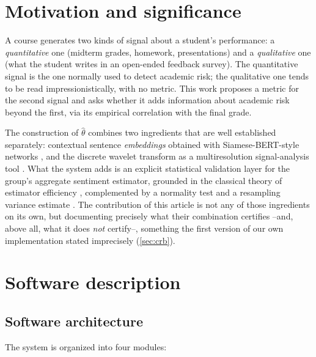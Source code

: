 \documentclass[11pt,a4paper,oneside]{article}
\theoremstyle{definition}
\begin{document}
\section{Motivation and significance}
\label{sec:motivacion}

A course generates two kinds of signal about a student's performance: a \emph{quantitative} one
(midterm grades, homework, presentations) and a \emph{qualitative} one (what the student writes
in an open-ended feedback survey). The quantitative signal is the one normally used to detect
academic risk; the qualitative one tends to be read impressionistically, with no metric. This
work proposes a metric for the second signal and asks whether it adds information about academic
risk beyond the first, via its empirical correlation with the final grade.

The construction of $\hat\theta$ combines two ingredients that are well established separately:
contextual sentence \emph{embeddings} obtained with Siamese-BERT-style networks
\cite{ReimersGurevych2019}, and the discrete wavelet transform as a multiresolution
signal-analysis tool \cite{Mallat1989}. What the system adds is an explicit statistical
validation layer for the group's aggregate sentiment estimator, grounded in the classical theory
of estimator efficiency \cite{Fisher1922,Rao1945,Cramer1946}, complemented by a normality test
\cite{ShapiroWilk1965} and a resampling variance estimate \cite{Efron1979}. The contribution of
this article is not any of those ingredients on its own, but documenting precisely what their
combination certifies --and, above all, what it does \emph{not} certify--, something the first
version of our own implementation stated imprecisely (\cref{sec:crb}).

\section{Software description}
\label{sec:descripcion}

\subsection{Software architecture}
\label{sec:arquitectura}

The system is organized into four modules:
\end{document}
